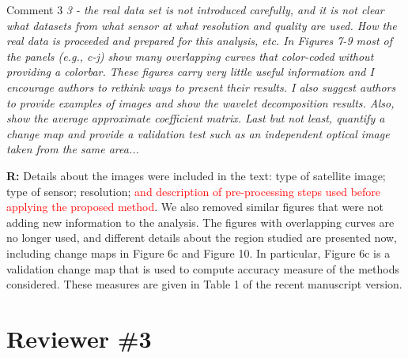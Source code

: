 \documentclass[11pt]{report}
\begin{document}

\vspace{0.3cm}


\medskip

\begin{mybox}{Comment 3}
\textit{3 - the real data set is not introduced carefully, and it is not clear what datasets from what sensor at what resolution and
quality are used. How the real data is proceeded and prepared for this analysis, etc. In Figures 7-9 most of the panels
(e.g., c-j) show many overlapping curves that color-coded without providing a colorbar. These figures carry very little
useful information and I encourage authors to rethink ways to present their results. I also suggest authors to provide
examples of images and show the wavelet decomposition results. Also, show the average approximate coefficient
matrix. Last but not least, quantify a change map and provide a validation test such as an independent optical image
taken from the same area...}

\medskip

\textbf{R:} Details about the images were included in the text: type of satellite image; type of sensor; resolution; \textcolor{red}{and description of pre-processing steps used before applying the proposed method}. We also removed similar figures that were not adding new information to the analysis. The figures with overlapping curves are no longer used, and different details about the region studied are presented now, including change maps in Figure 6c and Figure 10. In particular, Figure 6c is a validation change map that is used to compute accuracy measure of the methods considered. These measures are given in Table 1 of the recent manuscript version.
\end{mybox}


\newpage
\section*{Reviewer \#3}
\end{document}
